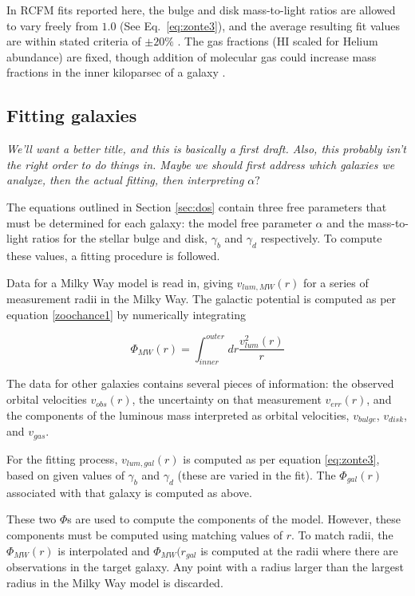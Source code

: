 \documentclass[reprint,%
 amsmath,amssymb,
 aps,
]{revtex4-1}
\begin{document}
 
In RCFM fits reported here, the    bulge and disk mass-to-light ratios are allowed to vary freely from $1.0$ (See Eq.~\ref{eq:zonte3}), and the average resulting fit values are within stated criteria    of $\pm 20\%$ \cite{2016Lelli}. The gas fractions (HI scaled for Helium abundance) are fixed,  though addition of molecular gas could increase mass fractions in the inner kiloparsec of a galaxy   \cite{2004ApJ...609..652M}.

\subsection{Fitting galaxies}
\emph{We'll want a better title, and this is basically a first draft.  Also, this probably isn't the right order to do things in. Maybe we should first address which galaxies we analyze, then the actual fitting, then interpreting $\alpha?$}

The equations outlined in Section \ref{sec:dos} contain three free parameters that must be determined for each galaxy: the model free parameter $\alpha$ and the mass-to-light ratios for the stellar bulge and disk, $\gamma_b$ and $\gamma_d$ respectively. To compute these values, a fitting procedure is followed.

Data for a Milky Way model is read in, giving $v_{lum,MW}(r)$ for a series of measurement radii in the Milky Way. The galactic potential is computed as per equation \ref{zoochance1} by numerically integrating

\begin{equation}
\Phi_{MW}(r) = \int_{inner}^{outer} dr \frac{v_{lum}^2(r)}{r}
\end{equation}

The data for other galaxies contains several pieces of information: the observed orbital velocities $v_{obs}(r)$, the uncertainty on that measurement $v_{err}(r)$, and the components of the luminous mass interpreted as orbital velocities,  $v_{bulge}$, $v_{disk}$, and $v_{gas}$. 

For the fitting process, $v_{lum,gal}(r)$ is computed as per equation \ref{eq:zonte3}, based on given values of $\gamma_b$ and $\gamma_d$ (these are varied in the fit). The $\Phi_{gal}(r)$ associated with that galaxy is computed as above.

These two $\Phi$s are used to compute the components of the model. However, these components must be computed using matching values of $r$. To match radii, the $\Phi_{MW}(r)$ is interpolated and $\Phi_{MW}(r_{gal}$ is computed at the radii where there are observations in the target galaxy. Any point with a radius larger than the largest radius in the Milky Way model is discarded.
\end{document}
